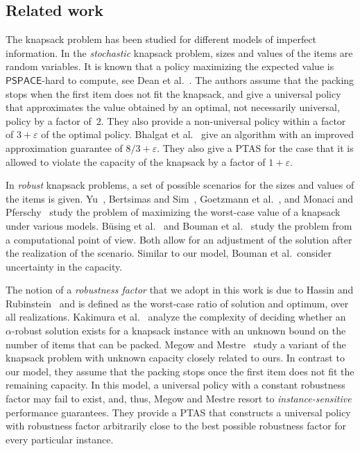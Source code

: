 \documentclass[11pt]{article}
\newcommand{\classPSPACS}{\mathsf{PSPACE}}
\renewcommand{\epsilon}{\varepsilon}
\begin{document}
\subsection*{Related work}

The knapsack problem has been studied for different models of imperfect
information. In the \emph{stochastic} knapsack problem, sizes and
values of the items are random variables. It is known that a policy
maximizing the expected value is $\classPSPACS$-hard to compute,
see Dean et al.~\cite{deanGV04}. The authors assume that the packing
stops when the first item does not fit the knapsack, and give a universal
policy that approximates the value obtained by an optimal, not necessarily
universal, policy by a factor of~$2$. They also provide a non-universal
policy within a factor of $3+\epsilon$ of the optimal policy. Bhalgat
et al.~\cite{bhalgatGK11} give an algorithm with an improved approximation
guarantee of $8/3+\epsilon$. They also give a PTAS for the case that
it is allowed to violate the capacity of the knapsack by a factor
of $1+\epsilon$.

In \emph{robust} knapsack problems, a set of possible scenarios for
the sizes and values of the items is given. Yu~\cite{yu96}, Bertsimas
and Sim~\cite{bertsimasS03}, Goetzmann et al.~\cite{GoetzmannST11},
and Monaci and Pferschy~\cite{monaciP11} study the problem of maximizing
the worst-case value of a knapsack under various models. Büsing et
al.~\cite{busingKK11-discrete} and Bouman et al.~\cite{boumanAH11}
study the problem from a computational point of view. Both allow for
an adjustment of the solution after the realization of the scenario.
Similar to our model, Bouman et al.~consider uncertainty in the capacity.

The notion of a \emph{robustness factor} that we adopt in this work
is due to Hassin and Rubinstein~\cite{hassinR02} and is defined
as the worst-case ratio of solution and optimum, over all realizations.
Kakimura et al.~\cite{kakimuraMS11} analyze the complexity of deciding
whether an $\alpha$-robust solution exists for a knapsack instance
with an unknown bound on the number of items that can be packed. Megow
and Mestre~\cite{megowM13} study a variant of the knapsack problem
with unknown capacity closely related to ours. In contrast to our
model, they assume that the packing stops once the first item does
not fit the remaining capacity. In this model, a universal policy
with a constant robustness factor may fail to exist, and, thus, Megow
and Mestre resort to \emph{instance-sensitive} performance guarantees.
They provide a PTAS that constructs a universal policy with robustness
factor arbitrarily close to the best possible robustness factor for
every particular instance.
\end{document}
